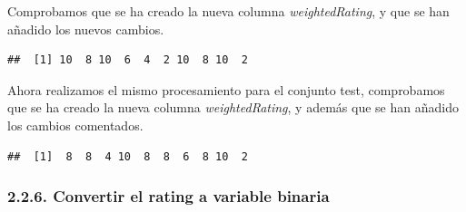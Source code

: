 \documentclass[spanish,]{article}
\newenvironment{Shaded}{\begin{snugshade}}{\end{snugshade}}
\newcommand{\KeywordTok}[1]{\textcolor[rgb]{0.13,0.29,0.53}{\textbf{#1}}}
\newcommand{\DecValTok}[1]{\textcolor[rgb]{0.00,0.00,0.81}{#1}}
\newcommand{\FloatTok}[1]{\textcolor[rgb]{0.00,0.00,0.81}{#1}}
\newcommand{\StringTok}[1]{\textcolor[rgb]{0.31,0.60,0.02}{#1}}
\newcommand{\CommentTok}[1]{\textcolor[rgb]{0.56,0.35,0.01}{\textit{#1}}}
\newcommand{\ControlFlowTok}[1]{\textcolor[rgb]{0.13,0.29,0.53}{\textbf{#1}}}
\newcommand{\OperatorTok}[1]{\textcolor[rgb]{0.81,0.36,0.00}{\textbf{#1}}}
\newcommand{\NormalTok}[1]{#1}
\begin{document}
\begin{Shaded}
\end{Shaded}

Comprobamos que se ha creado la nueva columna \emph{weightedRating}, y
que se han añadido los nuevos cambios.

\begin{Shaded}
\end{Shaded}

\begin{verbatim}
##  [1] 10  8 10  6  4  2 10  8 10  2
\end{verbatim}

Ahora realizamos el mismo procesamiento para el conjunto test,
comprobamos que se ha creado la nueva columna \emph{weightedRating}, y
además que se han añadido los cambios comentados.

\begin{Shaded}
\end{Shaded}

\begin{verbatim}
##  [1]  8  8  4 10  8  8  6  8 10  2
\end{verbatim}

\subsubsection{2.2.6. Convertir el rating a variable
binaria}\label{convertir-el-rating-a-variable-binaria}
\end{document}
